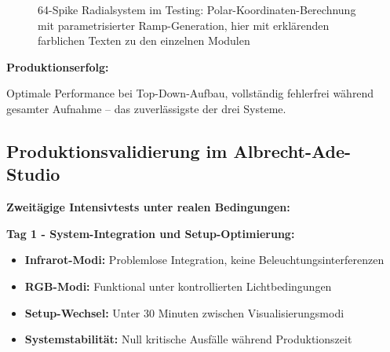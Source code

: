 \begin{figure}[htbp]
    \centering
    \caption{64-Spike Radialsystem im Testing: Polar-Koordinaten-Berechnung mit parametrisierter Ramp-Generation, hier mit erklärenden farblichen Texten zu den einzelnen Modulen}
    \label{fig:radial_spike_system}
\end{figure}

\textbf{Produktionserfolg:} \raggedright Optimale Performance bei Top-Down-Aufbau, vollständig fehlerfrei während gesamter Aufnahme – das zuverlässigste der drei Systeme.

\subsection{Produktionsvalidierung im Albrecht-Ade-Studio}

\textbf{Zweitägige Intensivtests unter realen Bedingungen:}

\textbf{Tag 1 - System-Integration und Setup-Optimierung:}
\begin{itemize}
    \item \textbf{Infrarot-Modi:} Problemlose Integration, keine Beleuchtungsinterferenzen
    \item \textbf{RGB-Modi:} Funktional unter kontrollierten Lichtbedingungen
    \item \textbf{Setup-Wechsel:} Unter 30 Minuten zwischen Visualisierungsmodi
    \item \textbf{Systemstabilität:} Null kritische Ausfälle während Produktionszeit
\end{itemize}

